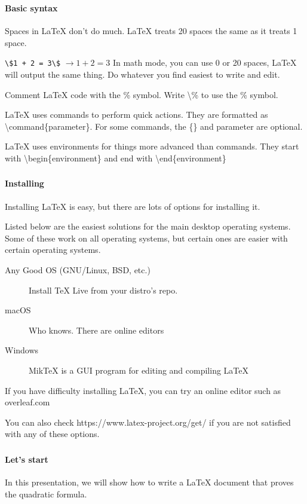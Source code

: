 \documentclass{beamer}
\begin{document}
	\begin{frame}
		\frametitle{\secname}
		\framesubtitle{Basic syntax}
		\begin{description}[<+->]
			\item[Spacing] Spaces in \LaTeX{} don't do much. \LaTeX{} treats 20 spaces the same as it treats 1 space.
			\item[Inline math] \lstinline{\$1 + 2 = 3\$} $\rightarrow 1 + 2 = 3$ In math mode, you can use 0 or 20 spaces, \LaTeX{} will output the same thing. Do whatever you find easiest to write and edit.
			\item[Comments] Comment \LaTeX{} code with the \% symbol. Write \textbackslash\% to use the \% symbol.
			\item[Commands] \LaTeX{} uses commands to perform quick actions. They are formatted as \textbackslash command\{parameter\}. For some commands, the \{\} and parameter are optional.
			\item[Environments] \LaTeX{} uses environments for things more advanced than commands. They start with \textbackslash begin\{environment\} and end with \textbackslash end\{environment\}
		\end{description}
	\end{frame}
	\begin{frame}
		\frametitle{\secname}
		\framesubtitle{Installing}
		Installing \LaTeX{} is easy, but there are lots of options for installing it.
		
		Listed below are the easiest solutions for the main desktop operating systems. Some of these work on all operating systems, but certain ones are easier with certain operating systems.
		\begin{description}
			\item[Any Good OS (GNU/Linux, BSD, etc.)] Install \TeX{} Live from your distro's repo.
			\item[macOS] Who knows. There are online editors
			\item[Windows] MikTeX is a GUI program for editing and compiling \LaTeX{}
		\end{description}
		If you have difficulty installing \LaTeX{}, you can try an online editor such as overleaf.com

		You can also check https://www.latex-project.org/get/ if you are not satisfied with any of these options.
	\end{frame}
	\begin{frame}
		\frametitle{\secname}
		\framesubtitle{Let's start}
		In this presentation, we will show how to write a \LaTeX{} document that proves the quadratic formula.
	\end{frame}
\end{document}
